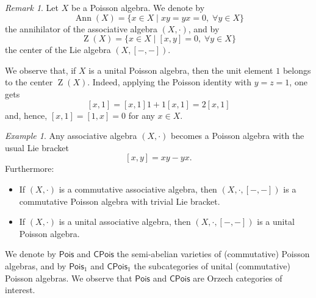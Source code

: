 \documentclass[reqno,a4paper]{amsart}
\theoremstyle{plain}
\theoremstyle{definition}
\theoremstyle{remark}
\newtheorem{remark}[subsection]{Remark}
\newtheorem{example}[subsection]{Example}
\numberwithin{equation}{section}
\DeclareMathOperator{\bZ}{Z}
\DeclareMathOperator{\Ann}{Ann}
\newcommand{\Pois}{\ensuremath{\mathsf{Pois}}}
\newcommand{\CPois}{\ensuremath{\mathsf{CPois}}}
\begin{document}
\begin{remark}
Let $X$ be a Poisson algebra. We denote by
\[
\Ann(X)=\{ x \in X \mid xy=yx=0, \; \forall y \in X \}
\]
the annihilator of the associative algebra $(X,\cdot)$, and by
\[
\bZ(X)=\{ x \in X \mid [x,y]=0, \; \forall y \in X \}
\]
the center of the Lie algebra $(X,[-,-])$.
\end{remark}

We observe that, if $X$ is a unital Poisson algebra, then the unit element $1$ belongs to the center $\bZ(X)$. Indeed, applying the Poisson identity with $y=z=1$, one gets
\[
[x,1]=[x,1]1+1[x,1]=2[x,1]
\]
and, hence, $[x,1]=[1,x]=0$ for any $x \in X$.

\begin{example}
Any associative algebra $(X,\cdot)$ becomes a Poisson algebra with the usual Lie bracket
\[
[x,y]=xy-yx.
\]
Furthermore:
\begin{itemize}
\item If $(X,\cdot)$ is a commutative associative algebra, then $(X,\cdot,[-,-])$ is a commutative Poisson algebra with trivial Lie bracket.
\item If $(X,\cdot)$ is a unital associative algebra, then $(X,\cdot,[-,-])$ is a unital Poisson algebra.
\end{itemize}
\end{example}

We denote by $\Pois$ and $\CPois$ the semi-abelian varieties of (commutative) Poisson algebras, and by $\Pois_1$ and $\CPois_1$ the subcategories of unital (commutative) Poisson algebras. We observe that $\Pois$ and $\CPois$ are Orzech categories of interest.
\end{document}
